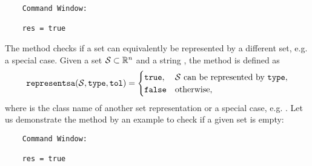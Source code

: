 \begin{center}
\begin{minipage}[t]{0.40\textwidth}
	\vspace{10pt}
	\footnotesize
	
\end{minipage}
\begin{minipage}[t]{0.25\textwidth}
	\vspace{10pt}

	\begin{verbatim}	
	Command Window:
	
	res = true
	\end{verbatim}
\end{minipage}
\end{center}

\vspace{1cm}

 \label{sec:representsa}

The method  checks if a set can equivalently be represented by a different set, e.g. a special case.
Given a set $\mathcal{S} \subset \mathbb{R}^n$ and a string , the method  is defined as
	\begin{equation*}
		{\normalfont \texttt{representsa}}(\mathcal{S},{\normalfont \texttt{type}},{\normalfont \texttt{tol}}) =
		\begin{cases}
			{\normalfont \texttt{true}}, & \mathcal{S} \text{ can be represented by } {\normalfont \texttt{type}}, \\
			{\normalfont \texttt{false}} & \mathrm{otherwise},
		\end{cases}
	\end{equation*}
where  is the class name of another set representation or a special case, e.g. .
Let us demonstrate the method  by an example to check if a given set is empty:

\begin{center}
\begin{minipage}[t]{0.40\textwidth}
	\vspace{10pt}
	\footnotesize
	
\end{minipage}
\begin{minipage}[t]{0.2\textwidth}
	\vspace{10pt}

	\begin{verbatim}
	Command Window:
		
	res = true
	\end{verbatim}
\end{minipage}
\begin{minipage}[t]{0.3\textwidth}
	\vspace{0pt}
	\centering
\end{minipage}
\end{center}


